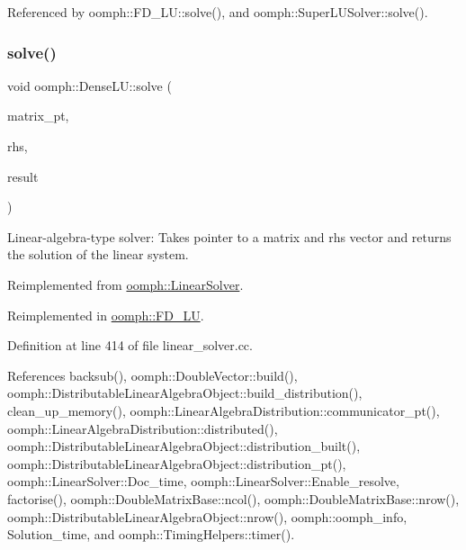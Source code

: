 Referenced by oomph\+::\+F\+D\+\_\+\+L\+U\+::solve(), and oomph\+::\+Super\+L\+U\+Solver\+::solve().

\mbox{\label{classoomph_1_1DenseLU_ae82e044bb5a1173b8105b6fedd904801}} 
\subsubsection{\texorpdfstring{solve()}{solve()}\hspace{0.1cm}{\footnotesize\ttfamily [2/3]}}
{\footnotesize\ttfamily void oomph\+::\+Dense\+L\+U\+::solve (\begin{DoxyParamCaption}\item[{\hyperlink{classoomph_1_1DoubleMatrixBase}{Double\+Matrix\+Base} $\ast$const \&}]{matrix\+\_\+pt,  }\item[{const \hyperlink{classoomph_1_1DoubleVector}{Double\+Vector} \&}]{rhs,  }\item[{\hyperlink{classoomph_1_1DoubleVector}{Double\+Vector} \&}]{result }\end{DoxyParamCaption})\hspace{0.3cm}{\ttfamily [virtual]}}



Linear-\/algebra-\/type solver\+: Takes pointer to a matrix and rhs vector and returns the solution of the linear system. 



Reimplemented from \hyperlink{classoomph_1_1LinearSolver_a546c09822d18191df14caed864c04c09}{oomph\+::\+Linear\+Solver}.



Reimplemented in \hyperlink{classoomph_1_1FD__LU_ab8c9d6006352d0ea61a721b9c58cd523}{oomph\+::\+F\+D\+\_\+\+LU}.



Definition at line 414 of file linear\+\_\+solver.\+cc.



References backsub(), oomph\+::\+Double\+Vector\+::build(), oomph\+::\+Distributable\+Linear\+Algebra\+Object\+::build\+\_\+distribution(), clean\+\_\+up\+\_\+memory(), oomph\+::\+Linear\+Algebra\+Distribution\+::communicator\+\_\+pt(), oomph\+::\+Linear\+Algebra\+Distribution\+::distributed(), oomph\+::\+Distributable\+Linear\+Algebra\+Object\+::distribution\+\_\+built(), oomph\+::\+Distributable\+Linear\+Algebra\+Object\+::distribution\+\_\+pt(), oomph\+::\+Linear\+Solver\+::\+Doc\+\_\+time, oomph\+::\+Linear\+Solver\+::\+Enable\+\_\+resolve, factorise(), oomph\+::\+Double\+Matrix\+Base\+::ncol(), oomph\+::\+Double\+Matrix\+Base\+::nrow(), oomph\+::\+Distributable\+Linear\+Algebra\+Object\+::nrow(), oomph\+::oomph\+\_\+info, Solution\+\_\+time, and oomph\+::\+Timing\+Helpers\+::timer().

